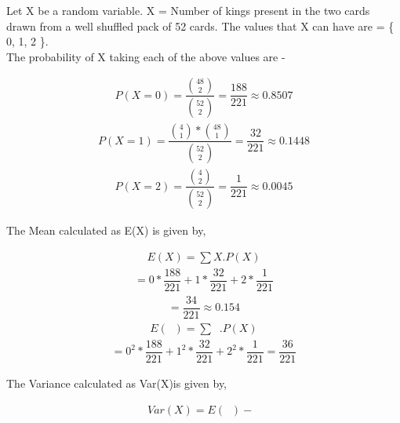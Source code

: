 \documentclass[journal,12pt,twocolumn]{IEEEtran}
\begin{document}
\subsection*{}\\
\begin{flushleft}Let X be a random variable.\newline
X = Number of kings present in the two cards drawn from a well shuffled pack of 52 cards.\newline
\newline The values that X can have are = \Big\{ 0, 1, 2 \Big\}.\\
\newline The probability of X taking each of the above values are - \end{flushleft}
\begin{align}P(X=0) = \dfrac{\binom{48}{2}}{\binom{52}{2}} = \dfrac{188}{221} \approx 0.8507\end{align}
\begin{align}P(X=1) = \dfrac{\binom{4}{1} * \binom{48}{1}}{\binom{52}{2}} = \dfrac{32}{221} \approx 0.1448\end{align}
\begin{align}P(X=2) = \dfrac{\binom{4}{2}}{\binom{52}{2}} = \dfrac{1}{221} \approx 0.0045\end{align}
\newline
\begin{flushleft}The Mean calculated as E(X) is given by,\end{flushleft}
\begin{align}E(X) = \sum X.P(X) \end{align}
\begin{align*}= 0*\dfrac{188}{221} + 1*\dfrac{32}{221} + 2*\dfrac{1}{221}\end{align*}
\begin{align*}= \dfrac{34}{221} \approx 0.154\end{align*}
\begin{align*}E(\mathop{X^2}) = \sum \mathop{X^2}.P(X)\end{align*}
\begin{align*}= 0^2 * \dfrac{188}{221} + 1^2 * \dfrac{32}{221} + 2^2 * \dfrac{1}{221} = \dfrac{36}{221}\end{align*}
\newline
\begin{flushleft}The Variance calculated as Var(X)is given by,\end{flushleft}
\begin{align}Var(X) = E(\mathop{X^2}) - \mathop{[E(X)]^2}\end{align}
\end{document}
